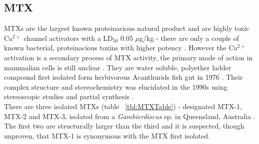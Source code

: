 \documentclass[12pt]{article}
\begin{document}
\subsection{MTX}

MTXs are the largest known proteinacious natural product \cite{yokoyama1988some,murata1993structure} and are highly toxic Ca$^{2+}$ channel activators with a LD$_{50}$ 0.05 $\mu$g/kg - there are only a couple of known bacterial, proteinacious toxins with higher potency \cite{yokoyama1988some,murata1993structure}. However the Ca$^{2+}$ activation is a secondary process of MTX activity, the primary mode of action in mammalian cells  is still unclear \cite{van2000diversity}. They are water soluble, polyether ladder compound first isolated form herbivorous Acanthurids fish gut in 1976 \cite{yasumoto1976toxicity}. Their complex structure and stereochemistry was elucidated in the 1990s using stereoscopic studies and partial synthesis \cite{murata1993structure,murata1994structure,satake1995structural,nonomura1996complete,zheng1996complete}. \\
There are three isolated MTXs (table ~\ref{tbl:MTXTable}) - designated MTX-1, MTX-2 and MTX-3, isolated from a \emph{Gambierdiscus} sp. in Queensland, Australia \cite{holmes1994purification}. The first two are structurally larger than the third and it is suspected, though unproven, that MTX-1 is synonymous with the MTX first isolated. \\ %


\end{document}

